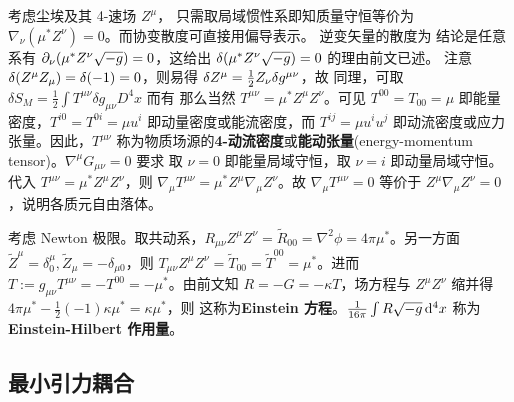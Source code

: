 考虑尘埃及其 4-速场 $Z^\mu$，
只需取局域惯性系即知质量守恒等价为 $\nabla_\nu(\mu^* Z^\nu)=0$。而协变散度可直接用偏导表示。
逆变矢量的散度为
结论是任意系有 $\partial_\nu(\mu^* Z^\nu\sqrt{-g})=0$，这给出 $\var(\mu^* Z^\nu\sqrt{-g})=0$ 的理由前文已述。
注意 $\var(Z^\mu Z_\mu)=\var(-1)=0$，则易得 $\var Z^\mu=\frac 12 Z_\nu \var g^{\mu\nu}$，故
同理，可取 $\delta S_M =\frac{1}{2} \int T^{\mu \nu} \delta g_{\mu \nu} D^4{x}$ 而有
那么当然 $T^{\mu\nu}=\mu^* Z^\mu Z^\nu$。可见 $T^{00}=T_{00}=\mu$ 即能量密度，$T^{i0}=T^{0i}=\mu u^i $ 即动量密度或能流密度，而 $T^{ij}=\mu u^i u^j$ 即动流密度或应力张量。因此，$T^{\mu\nu}$ 称为物质场源的\textbf{4-动流密度}或\textbf{能动张量}(energy-momentum tensor)。$\nabla^{\mu}G_{\mu\nu}=0$ 要求
取 $\nu=0$ 即能量局域守恒，取 $\nu=i$ 即动量局域守恒。代入 $T^{\mu\nu}=\mu^* Z^\mu Z^\nu$，则 $\nabla_\mu T^{\mu\nu}=\mu^* Z^\mu\nabla_\mu Z^\nu$。故 $\nabla_\mu T^{\mu\nu}=0$ 等价于 $Z^\mu\nabla_\mu Z^\nu =0$，说明各质元自由落体。

考虑 Newton 极限。取共动系，$R_{\mu\nu}Z^\mu Z^\nu=\tilde R_{00}=\nabla^2\phi= 4\pi\mu^*$。另一方面 $\tilde Z^\mu=\delta^\mu_0,\tilde Z_\mu=-\delta_{\mu 0}$，则 $T_{\mu\nu}Z^\mu Z^\nu=\tilde T_{00}=\tilde T^{00}=\mu^*$。进而 $T:=g_{\mu\nu}T^{\mu\nu}=-T^{00}=-\mu^*$。由前文知 $R=-G=-\kappa T$，场方程与 $Z^\mu Z^\nu$ 缩并得 $4\pi\mu^*-\frac 12 (-1)\kappa \mu^*=\kappa\mu^*$，则
这称为\textbf{Einstein 方程}。$\frac{1}{16\pi}\int R \sqrt{-g}\dd[4]{x}$ 称为\textbf{Einstein-Hilbert 作用量}。

\subsection{最小引力耦合}

